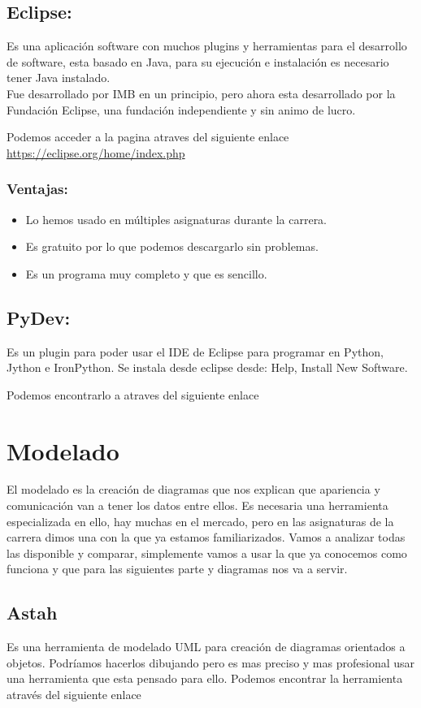 \subsection{Eclipse:}
Es una aplicación software con muchos plugins y herramientas para el desarrollo de software, esta basado en Java, para su ejecución e instalación es necesario tener Java instalado.\\
Fue desarrollado por IMB en un principio, pero ahora esta desarrollado por la Fundación Eclipse, una fundación independiente y sin animo de lucro.


Podemos acceder a la pagina atraves del siguiente enlace  \url{https://eclipse.org/home/index.php}

\subsubsection{Ventajas:}
\begin{itemize}
	\item Lo hemos usado en múltiples asignaturas durante la carrera.
	\item Es gratuito por lo que podemos descargarlo sin problemas.
	\item Es un programa muy completo y que es sencillo.
\end{itemize}

\subsection{PyDev:}
Es un plugin para poder usar el IDE de Eclipse para programar en Python, Jython e IronPython.
Se instala desde eclipse desde: Help, Install New Software.

Podemos encontrarlo a atraves del siguiente enlace \cite{Eclipse:PyDev}

\section{Modelado}
El modelado es la creación de diagramas que nos explican que apariencia y comunicación van a tener los datos entre ellos.
Es necesaria una herramienta especializada en ello, hay muchas en el mercado, pero en las asignaturas de la carrera dimos una con la que ya estamos familiarizados.
Vamos a analizar todas las disponible y comparar, simplemente vamos a usar la que ya conocemos como funciona y que para las siguientes parte y diagramas nos va a servir.

\subsection{Astah}
Es una herramienta de modelado UML para creación de diagramas orientados a objetos.
Podríamos hacerlos dibujando pero es mas preciso y mas profesional usar una herramienta que esta pensado para ello.
Podemos encontrar la herramienta através del siguiente enlace  \cite{Modelado:Astah}


